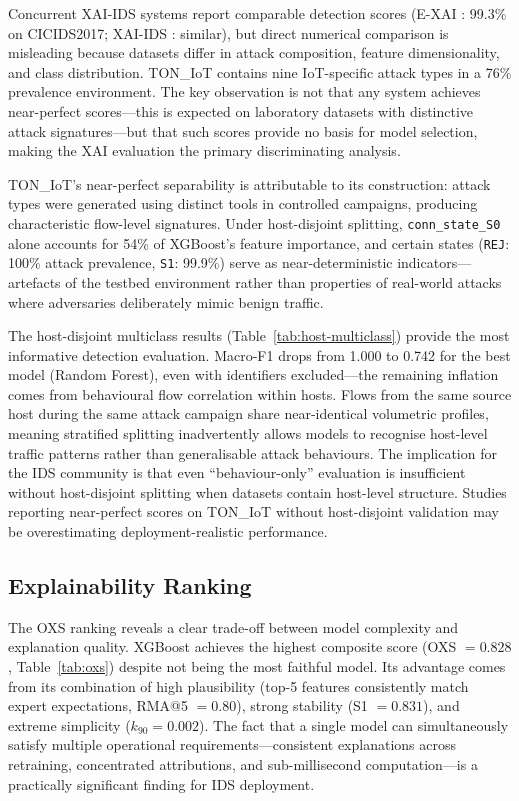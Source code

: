 \documentclass[12pt,a4paper]{report}
\begin{document}
Concurrent XAI-IDS systems report comparable detection scores (E-XAI \cite{arreche2024}: 99.3\% on CICIDS2017; XAI-IDS \cite{arreche2024b}: similar), but direct numerical comparison is misleading because datasets differ in attack composition, feature dimensionality, and class distribution. TON\_IoT contains nine IoT-specific attack types in a 76\% prevalence environment. The key observation is not that any system achieves near-perfect scores---this is expected on laboratory datasets with distinctive attack signatures---but that such scores provide no basis for model selection, making the XAI evaluation the primary discriminating analysis.

TON\_IoT's near-perfect separability is attributable to its construction: attack types were generated using distinct tools in controlled campaigns, producing characteristic flow-level signatures. Under host-disjoint splitting, \texttt{conn\_state\_S0} alone accounts for 54\% of XGBoost's feature importance, and certain states (\texttt{REJ}: 100\% attack prevalence, \texttt{S1}: 99.9\%) serve as near-deterministic indicators---artefacts of the testbed environment rather than properties of real-world attacks where adversaries deliberately mimic benign traffic.

The host-disjoint multiclass results (Table~\ref{tab:host-multiclass}) provide the most informative detection evaluation. Macro-F1 drops from 1.000 to 0.742 for the best model (Random Forest), even with identifiers excluded---the remaining inflation comes from behavioural flow correlation within hosts. Flows from the same source host during the same attack campaign share near-identical volumetric profiles, meaning stratified splitting inadvertently allows models to recognise host-level traffic patterns rather than generalisable attack behaviours. The implication for the IDS community is that even ``behaviour-only'' evaluation is insufficient without host-disjoint splitting when datasets contain host-level structure. Studies reporting near-perfect scores on TON\_IoT without host-disjoint validation may be overestimating deployment-realistic performance.

\subsection{Explainability Ranking}
\label{sec:disc-xai}

The OXS ranking reveals a clear trade-off between model complexity and explanation quality. XGBoost achieves the highest composite score (OXS $= 0.828$, Table~\ref{tab:oxs}) despite not being the most faithful model. Its advantage comes from its combination of high plausibility (top-5 features consistently match expert expectations, RMA@5 $= 0.80$), strong stability (S1 $= 0.831$), and extreme simplicity ($k_{90} = 0.002$). The fact that a single model can simultaneously satisfy multiple operational requirements---consistent explanations across retraining, concentrated attributions, and sub-millisecond computation---is a practically significant finding for IDS deployment.
\end{document}
